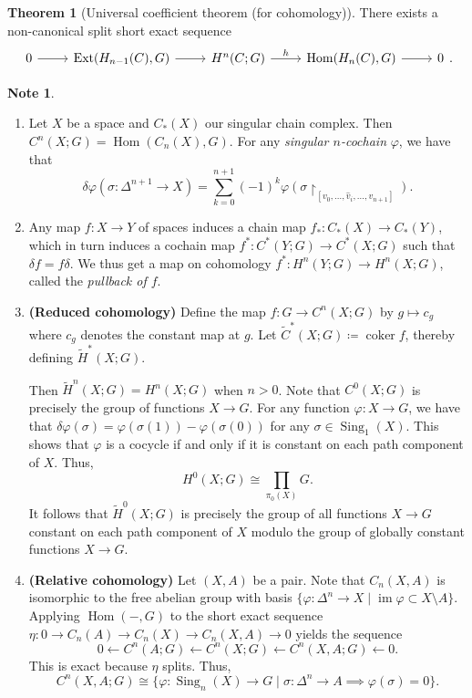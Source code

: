 \documentclass[10pt,letterpaper,cm]{nupset}
\theoremstyle{definition}
\newtheorem{note}[definition]{Note}
\theoremstyle{theorem}
\newtheorem{theorem}[definition]{Theorem}
\theoremstyle{remark}
\newcommand{\1}{\mathbb{1}}
\newcommand{\0}{\vec 0}
\newcommand{\from}{\longleftarrow}
\DeclareMathOperator{\im}{im}
\DeclareMathOperator{\ext}{Ext}
\DeclareMathOperator{\Hom}{Hom}
\DeclareMathOperator{\coker}{coker}
\DeclareMathOperator{\sing}{Sing}
\begin{document}
\begin{theorem}[Universal coefficient theorem (for cohomology)]
There exists a non-canonical split short exact sequence $$\begin{tikzcd}
0 \arrow[r] & \ext(H_{n-1}(C), G) \arrow[r] & H^n(C; G) \arrow[r, "h"] & \Hom(H_n(C), G) \arrow[r] & 0
\end{tikzcd}     .$$
\end{theorem}

\begin{note} $ $
\begin{enumerate}
\item Let $X$ be a space and $C_{\ast}(X)$ our singular chain complex. Then $C^n(X; G) = \Hom(C_n(X), G)$. For any \textit{singular $n$-cochain} $\varphi$, we have that $$\delta{\varphi}(\sigma : \Delta^{n+1} \to X) = \sum_{k=0}^{n+1}({-}1)^k\varphi(\sigma \restriction_{ [v_0, \ldots, \hat{v}_i, \ldots, v_{n+1}]}).$$ 
\item Any map $f: X \to Y$ of spaces induces a chain map $f_{\ast} : C_{\ast}(X) \to C_{\ast}(Y)$, which in turn induces a cochain map $f^{\ast} : C^{\ast}(Y; G) \to C^{\ast}(X; G)$ such that $\delta{f} = f{\delta}$.  We thus get a map on cohomology $f^{\ast} : H^n(Y; G) \to H^n(X;G)$, called the \textit{pullback of $f$}.
\item  {\textbf{(Reduced cohomology)}} Define the map $f : G \to C^n(X; G)$ by $g \mapsto c_g$ where $c_g$ denotes the constant map at $g$. Let $\widetilde{C}^{\ast}(X; G) \coloneqq  \coker{f}$, thereby defining $\widetilde{H}^{\ast}(X; G)$.

Then $\widetilde{H}^n(X; G) = H^n(X; G)$ when $n>0$. Note that $C^0(X; G)$ is precisely the group of functions $X \to G$. For any function $\varphi : X \to G$, we have that $\delta{\varphi}(\sigma) = \varphi(\sigma(1)) - \varphi(\sigma(0))$ for any $\sigma \in \sing_1(X)$. This shows that $\varphi$ is a cocycle if and only if it is constant on each path component of $X$. Thus, $$H^0(X; G) \cong \prod_{\pi_0(X)} G.$$ It follows that $\widetilde{H}^0(X; G)$ is precisely the group of all functions $X \to G$ constant on each path component of $X$ modulo the group of globally constant functions $X \to G$.
\item  {\textbf{(Relative cohomology)}} Let $(X, A)$ be a pair.  Note that $C_n(X,A)$ is isomorphic to the free abelian group with basis $\{\varphi : \Delta^n \to X \mid \im{\varphi} \subset X \setminus A\}$. Applying $\Hom({-}, G)$ to the short exact sequence $\eta: 0 \to C_n(A) \to C_n(X) \to C_n(X,A) \to 0$ yields the sequence $$ 0 \from C^n(A; G) \from C^n(X; G) \from C^n(X, A; G) \from 0  .$$ This is exact because $\eta$ splits. Thus, $$ C^n(X, A; G) \cong \{\varphi : \sing_n(X) \to G \mid \sigma : \Delta^n \to A \implies \varphi(\sigma) = 0\}.$$
\end{enumerate}
\end{note}
\end{document}
